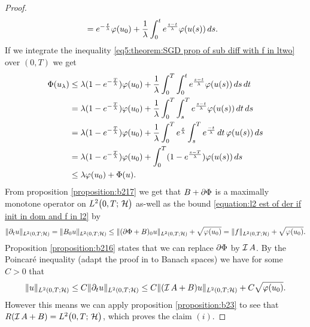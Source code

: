 \begin{proof}
\begin{align*}
		&=e^{-\frac{t}{\lambda}}\varphi(u_0)
		+\frac{1}{\lambda}\int_0^t e^{\frac{s-t}{\lambda}} \varphi(u(s))\,ds.
	\end{align*}
	If we integrate the inequality 
	\eqref{eq5:theorem:SGD prop of sub diff with f in ltwo} 
	over $ (0,T) $ we get
	\begin{align*}
		\Phi(u_\lambda)
		&\leq \lambda(1-e^{-\frac{T}{\lambda}})\varphi(u_0)
		+\frac{1}{\lambda}\int_0^T\int_0^t 
		e^{\frac{s-t}{\lambda}} \varphi(u(s))\,ds\,dt\\
		&= \lambda(1-e^{-\frac{T}{\lambda}})\varphi(u_0)
		+\frac{1}{\lambda}\int_0^T\int_s^T 
		e^{\frac{s-t}{\lambda}} \varphi(u(s))\,dt\,ds\\
		&= \lambda(1-e^{-\frac{T}{\lambda}})\varphi(u_0)
		+\frac{1}{\lambda}\int_0^T
		e^{\frac{s}{\lambda}}\int_s^T 
		e^{\frac{-t}{\lambda}}\,dt\,\varphi(u(s))\,ds\\
		&= \lambda(1-e^{-\frac{T}{\lambda}})\varphi(u_0)
		+\int_0^T (1-e^{\frac{s-T}{\lambda}}) \varphi(u(s))\,ds\\
		&\leq \lambda\varphi(u_0)+\Phi(u).
	\end{align*}
	From proposition \ref{proposition:b217} 
	we get that $ B+\partial\Phi $ is a maximally monotone
	operator on $ L^{2}\big(0,T;\,\mathcal{H}\big) $ as-well as the bound
	\eqref{equation:l2 est of der if init in dom and f in l2}
	by
	\begin{align*}
		\Vert \partial_t u\Vert_{L^2(0,T;\mathcal{H})}
		=\Vert B_0 u\Vert_{L^2(0,T;\mathcal{H})}
		\leq \Vert (\partial\Phi+B)_0 u\Vert_{L^2(0,T;\mathcal{H})}
		+\sqrt{\varphi(u_0)} 
		=\Vert f\Vert_{L^2(0,T;\mathcal{H})}
		+\sqrt{\varphi(u_0)}.
	\end{align*}
	Proposition \ref{proposition:b216} states that we can replace $ \partial\Phi $ by $ \operatorname{\mathcal{I}} A $. 
	By the Poincaré inequality (adapt the proof in 
	\cite[Proposition 8.13]{brezis2011functional}
	to Banach spaces) we have for some $ C>0 $ that
	\begin{align*}
		\Vert u\Vert_{L^2(0,T;\mathcal{H})} 
		\leq C \Vert \partial_t u\Vert_{L^2(0,T;\mathcal{H})}
		\leq C\Vert (\operatorname{\mathcal{I}} A+B) u\Vert_{L^2(0,T;\mathcal{H})}
		+C\sqrt{\varphi(u_0)}.
	\end{align*}
	However this means we can apply proposition \ref{proposition:b23}
	to see that $ R(\operatorname{\mathcal{I}} A+B)=L^{2}\big(0,T;\,\mathcal{H}\big) $, which proves the claim $ (i) $. \smallskip
	

\end{proof}
